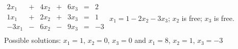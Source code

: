 {$\begin{array}{KQKQKQJ}
2x_1&+&4x_2&+&6x_3&=&2\\
1x_1&+&2x_2&+&3x_3&=&1\\
-3x_1&-&6x_2&-&9x_3&=&-3\\
\end{array}$}
{$x_1=1-2x_2-3x_3$; $x_2$ is free; $x_3$ is free.
Possible solutions: $x_1=1$, $x_2=0$, $x_3=0$ and $x_1=8$, $x_2=1$, $x_3 = -3$}
